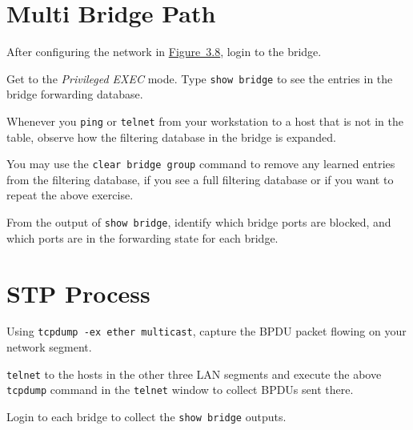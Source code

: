 \documentclass{../UTNetLab}
\begin{document}
\section{Multi Bridge Path}
    After configuring the network in \hyperref[fig:3.8]{Figure~3.8}, login to the bridge.

    Get to the \textit{Privileged EXEC} mode. Type \lstinline[language={cisco}]{show bridge} to see the entries in the bridge forwarding database.

    Whenever you \lstinline{ping} or \lstinline{telnet} from your workstation to a host that is not in the table, observe how the filtering database in the bridge is expanded.

    You may use the \lstinline[language={cisco}, emph={group}]{clear bridge group} command to remove any learned entries from the filtering database, if you see a full filtering database or if you want to repeat the above exercise.

    \begin{report}
    \item From the output of \lstinline[language={cisco}]{show bridge}, identify which bridge ports are blocked, and which ports are in the forwarding state for each bridge.
    \end{report}

\section{STP Process}
    Using \lstinline{tcpdump -ex ether multicast}, capture the BPDU packet flowing on your network segment.

    \lstinline{telnet} to the hosts in the other three LAN segments and execute the above \lstinline{tcpdump} command in the \lstinline{telnet} window to collect BPDUs sent there.

    Login to each bridge to collect the \lstinline[language={cisco}]{show bridge} outputs.
    
\end{document}

